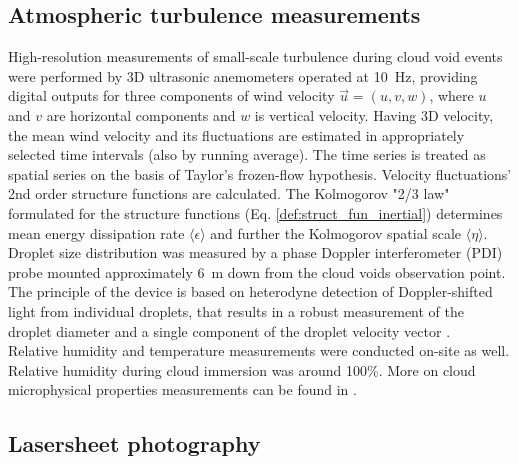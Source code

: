 \documentclass[../main.tex]{subfiles}
\begin{document}
\subsection{Atmospheric turbulence measurements}
High-resolution measurements of small-scale turbulence during cloud void events were performed by 3D ultrasonic anemometers operated at 10~Hz, providing digital outputs for three components of wind velocity $\vec{u}=(u,v,w)$, where $u$ and $v$ are horizontal components and $w$ is vertical velocity. Having 3D velocity, the mean wind velocity and its fluctuations are estimated in appropriately selected time intervals (also by running average). The time series is treated as spatial series on the basis of Taylor’s frozen-flow hypothesis. Velocity fluctuations' 2nd order structure functions are calculated. The Kolmogorov "2/3 law" formulated for the structure functions (Eq. \ref{def:struct_fun_inertial}) determines mean energy dissipation rate $\langle\epsilon\rangle$ and further the Kolmogorov spatial scale $\langle\eta\rangle$.\\
Droplet size distribution was measured by a phase Doppler interferometer (PDI) probe mounted approximately 6~m down from the cloud voids observation point. The principle of the device is based on heterodyne detection of Doppler-shifted light from individual droplets, that results in a robust measurement of the droplet diameter and a single component of the droplet velocity vector \citep{Chuang2008}.\\
Relative humidity and temperature measurements were conducted on-site as well. Relative humidity during cloud immersion was around 100\%. More on cloud microphysical properties measurements can be found in \citet{Siebert2015}.\\

\subsection{Lasersheet photography}
\end{document}
